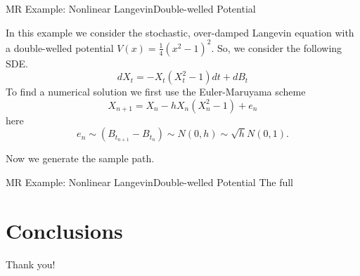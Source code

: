 \documentclass{beamer}  %
\begin{document}

\begin{frame}{MR Example: Nonlinear Langevin}{Double-welled Potential}
	
		In this example we consider the stochastic, over-damped Langevin equation with a double-welled potential $V(x) = \frac{1}{4}(x^2 - 1)^2$. So, we consider the following SDE. 
		$$dX_t = -X_t(X_t^2 - 1)dt + dB_t$$
		To find a numerical solution we first use the Euler-Maruyama scheme 
		$$X_{n+1} = X_n - h X_n(X_n^2 - 1) + e_n$$
		here $$e_n \sim (B_{t_{n+1}}-B_{t_{n}}) \sim N(0,h) \sim \sqrt{h} N(0,1).$$
		
		Now we generate the sample path.
\end{frame}


\begin{frame}{MR Example: Nonlinear Langevin}{Double-welled Potential}
	The full 

\end{frame}

\section{Conclusions}



\begin{frame}
Thank you!
\end{frame}
\end{document}
